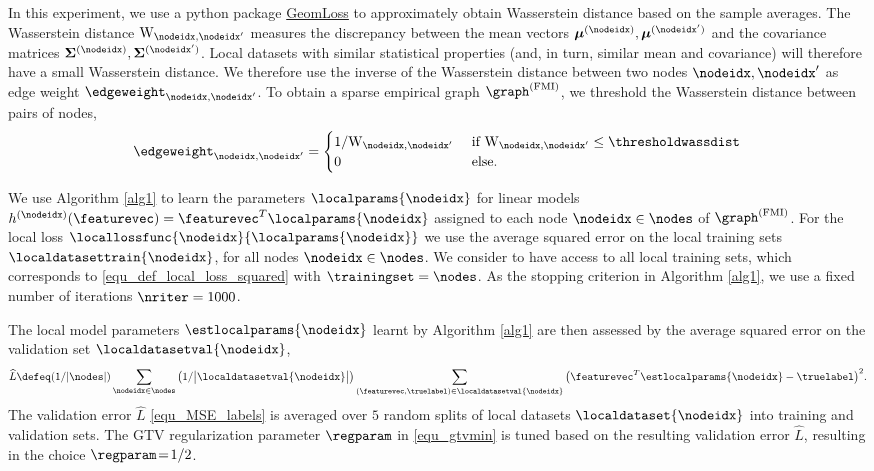 \documentclass[lettersize,journal]{IEEEtran}
\newcommand{\testmse}{\widehat{L} }
\begin{document}
In this experiment, we use a python package \href{https://www.kernel-operations.io/geomloss/}{GeomLoss} to approximately obtain Wasserstein distance based on the sample averages. The Wasserstein distance $\mathrm{W}_{\nodeidx,\nodeidx'}$ measures the discrepancy between the 
mean vectors ${\bm \mu}^{(\nodeidx)},{\bm \mu}^{(\nodeidx')}$ and the covariance matrices ${\bf \Sigma}^{(\nodeidx)},{\bf \Sigma}^{(\nodeidx')}$. 
Local datasets with similar statistical properties (and, in turn, similar mean and covariance) will therefore 
have a small Wasserstein distance. We therefore use the inverse of the Wasserstein distance between 
two nodes $\nodeidx,\nodeidx'$ as edge weight $\edgeweight_{\nodeidx,\nodeidx'} $. To obtain a 
sparse empirical graph $\graph^{(\rm FMI)}$, we threshold the Wasserstein distance between pairs of nodes, 
\begin{equation} 
	\label{equ_def_edges_FMI_graph}
\edgeweight_{\nodeidx, \nodeidx'} = \begin{cases} 1/ \mathrm{W}_{\nodeidx,\nodeidx'} & \mbox{  if } \mathrm{W}_{\nodeidx,\nodeidx'}\leq  \thresholdwassdist \\ 
	0 & \mbox{ else.} 
	\end{cases}
\end{equation}

We use Algorithm \ref{alg1} to learn the parameters $\localparams{\nodeidx}$ 
for linear models $h^{(\nodeidx)}(\featurevec) = \featurevec^{T} \localparams{\nodeidx}$ assigned to 
each node $\nodeidx \in \nodes$ of $\graph^{(\rm FMI)}$. For the local loss $\locallossfunc{\nodeidx}{\localparams{\nodeidx}}$ 
we use the average squared error on the local training sets $\localdatasettrain{\nodeidx}$, for all nodes $\nodeidx \in \nodes$. 
We consider to have access to all local training sets, which corresponds to \eqref{equ_def_local_loss_squared} with $\trainingset = \nodes$. 
As the stopping criterion in Algorithm \ref{alg1}, we use a fixed number of iterations $\nriter=1000$. 

The local model parameters $\estlocalparams{\nodeidx}$ learnt by Algorithm \ref{alg1} are then 
assessed by the average squared error on the validation set $\localdatasetval{\nodeidx}$,  
\begin{equation}
	\label{equ_MSE_labels}
	\testmse \defeq (1/|\nodes|) \sum_{\nodeidx \in \nodes}  \big(1/ \big|\localdatasetval{\nodeidx}\big| \big)
	\sum_{\left( \featurevec,\truelabel\right) \in \localdatasetval{\nodeidx}}  \big( \featurevec^{T}\estlocalparams{\nodeidx}- \truelabel\big)^2. 
\end{equation} 
The validation error $\testmse$ \eqref{equ_MSE_labels} is averaged over $5$ random splits of local datasets $\localdataset{\nodeidx}$ 
into training and validation sets. The GTV regularization parameter $\regparam$ 
in \eqref{equ_gtvmin} is tuned based on the resulting validation error $\testmse$, resulting in the choice $\regparam\!=\!1/2$. 
\end{document}
